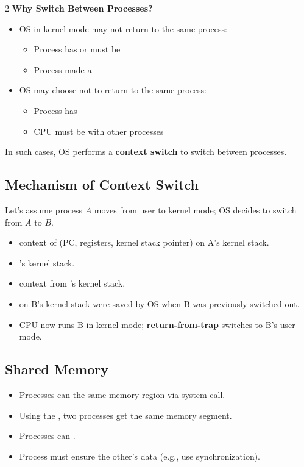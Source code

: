 \begin{multicols}{2}
\textbf{Why Switch Between Processes?}
\begin{itemize}[topsep=-0.5em, parsep=0.5em]
   \item OS in kernel mode may not return to the same process:
   \begin{itemize}
       \item Process has  or must be 
       \item Process made a 
   \end{itemize}
   \item OS may choose not to return to the same process:
   \begin{itemize}
       \item Process has 
       \item CPU must be  with other processes
   \end{itemize}
\end{itemize}
In such cases, OS performs a \textbf{context switch} to switch between processes.

\subsection*{Mechanism of Context Switch}
Let's assume process $A$ moves from user to kernel mode; OS decides to switch from $A$ to $B$.

\begin{itemize}[topsep=-0.5em, parsep=0.5em, leftmargin=1em]
   \item {} context of  (PC, registers, kernel stack pointer) on A's kernel stack.
   \item {}'s kernel stack.
   \item {} context from 's kernel stack.
   \item {} on B's kernel stack were saved by OS when B was previously switched out.
   \item CPU now runs B in kernel mode; \textbf{return-from-trap} switches to B's user mode.
\end{itemize}

\columnbreak


\subsection*{Shared Memory}
\begin{itemize}[topsep=-0.5em, parsep=0.5em, leftmargin=1em]
   \item	Processes can  the same memory region via \texttt{} system call.
   \item	Using the , two processes get the same memory segment.
   \item	Processes can .
   \item Process must ensure  the other's data (e.g., use synchronization).
\end{itemize}


\end{multicols}
